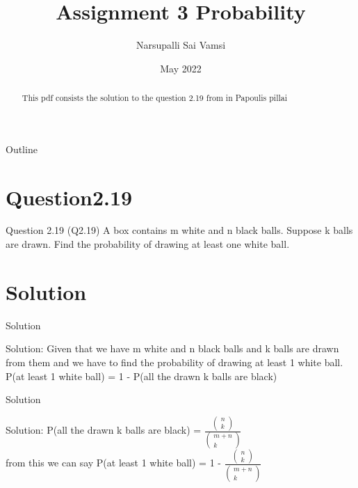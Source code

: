 \documentclass{beamer}
\title{Assignment 3 Probability}
\author{Narsupalli Sai Vamsi}
\date{May 2022}
\begin{document}
\begin{frame}
 \titlepage  
 \begin{abstract}
    This pdf consists the solution to the question 2.19 from in Papoulis pillai
\end{abstract}
\end{frame}
\begin{frame}{Outline}
\tableofcontents
\end{frame}
\section{Question2.19}
\begin{frame}{Question 2.19}
 (Q2.19) A box contains m white and n black balls. Suppose k balls are drawn. Find the probability of drawing at least one white ball.   
\end{frame}
\section{Solution}
\begin{frame}{Solution}
   \begin{block}{Solution:}
     Given that we have m white and n black balls and k balls are drawn from them and we have to find the probability of drawing at least 1 white ball.
     P(at least 1 white ball) = 1 - P(all the drawn k balls are black)
   \end{block}
\end{frame}
\begin{frame}{Solution}
\begin{block}{Solution:}
P(all the drawn k balls are black) = $\frac{\begin{pmatrix} n \\ k\end{pmatrix}}
{\begin{pmatrix}m+n\\k\end{pmatrix}}$\\
from this we can say P(at least 1 white ball) =  
1 - $\frac{\begin{pmatrix}n\\k\end{pmatrix}}{\begin{pmatrix}m+n\\k\end{pmatrix}}$
\end{block}
\end{frame}
\end{document}
